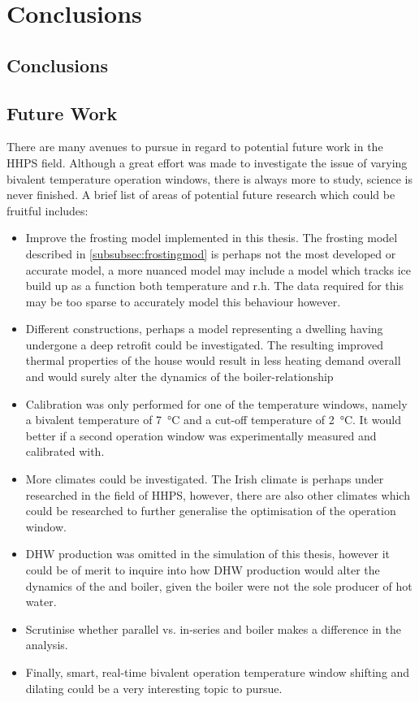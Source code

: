\chapter{Conclusions}\label{ch:conclusions} 

\section{Conclusions}


\section{Future Work}
There are many avenues to pursue in regard to potential future work in the \ac{HHPS} field. Although a great effort was made to investigate the issue of varying bivalent temperature operation windows, there is always more to study, science is never finished. A brief list of areas of potential future research which could be fruitful includes:
\begin{itemize}
    \item Improve the frosting model implemented in this thesis. The frosting model described in \cref{subsubsec:frostingmod} is perhaps not the most developed or accurate model, a more nuanced model may include a model which tracks ice build up as a function both temperature and r.h. The data required for this may be too sparse to accurately model this behaviour however.
    \item Different constructions, perhaps a model representing a dwelling having undergone a deep retrofit could be investigated. The resulting improved thermal properties of the house would result in less heating demand overall and would surely alter the dynamics of the boiler-\HP relationship
    \item Calibration was only performed for one of the temperature windows, namely a bivalent temperature of \qty{7}{\celsius} and a cut-off temperature of \qty{2}{\celsius}. It would better if a second operation window was experimentally measured and calibrated with. 
    \item More climates could be investigated. The Irish climate is perhaps under researched in the field of \ac{HHPS}, however, there are also other climates which could be researched to further generalise the optimisation of the operation window.
    \item \ac{DHW} production was omitted in the simulation of this thesis, however it could be of merit to inquire into how  \ac{DHW} production would alter the dynamics of the \HP and boiler, given the boiler were not the sole producer of hot water.
    \item Scrutinise whether parallel vs. in-series \HP and boiler makes a difference in the analysis.
    \item Finally, smart, real-time bivalent operation temperature window shifting and dilating could be a very interesting topic to pursue. 
\end{itemize}

